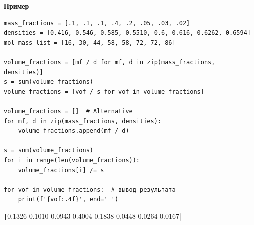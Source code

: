 \documentclass[aspectratio=169, mathserif]{beamer}%
\begin{document}
\begin{frame}[fragile]{\space}
\scriptsize
\begin{alertblock}{\textbf{Пример}}
\begin{verbatim}
mass_fractions = [.1, .1, .1, .4, .2, .05, .03, .02]
densities = [0.416, 0.546, 0.585, 0.5510, 0.6, 0.616, 0.6262, 0.6594]
mol_mass_list = [16, 30, 44, 58, 58, 72, 72, 86]

volume_fractions = [mf / d for mf, d in zip(mass_fractions, densities)]
s = sum(volume_fractions)
volume_fractions = [vof / s for vof in volume_fractions]

volume_fractions = []  # Alternative
for mf, d in zip(mass_fractions, densities):
    volume_fractions.append(mf / d)

s = sum(volume_fractions)
for i in range(len(volume_fractions)):
    volume_fractions[i] /= s
    
for vof in volume_fractions:  # вывод результата
    print(f'{vof:.4f}', end=' ')
\end{verbatim}
\texttt|0.1326 0.1010 0.0943 0.4004 0.1838 0.0448 0.0264 0.0167|
\end{alertblock}
\vfill
\end{frame}


\end{document}
